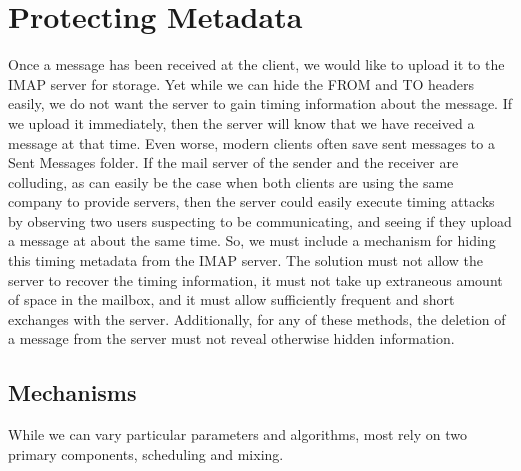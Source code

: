 \documentclass[pageno]{jpaper}
\newcommand{\project}{IMAPSec }
\begin{document}
\section{Protecting Metadata}
Once a message has been received at the client, we would like to upload it to the IMAP server for storage. Yet while we can hide the FROM and TO headers easily, we do not want the server to gain timing information about the message. If we upload it immediately, then the server will know that we have received a message at that time. Even worse, modern clients often save sent messages to a Sent Messages folder. If the mail server of the sender and the receiver are colluding, as can easily be the case when both clients are using the same company to provide servers, then the server could easily execute timing attacks by observing two users suspecting to be communicating, and seeing if they upload a message at about the same time. So, we must include a mechanism for hiding this timing metadata from the IMAP server. The solution must not allow the server to recover the timing information, it must not take up extraneous amount of space in the mailbox, and it must allow sufficiently frequent and short exchanges with the server. Additionally, for any of these methods, the deletion of a message from the server must not reveal otherwise hidden information.

\subsection{Mechanisms}
While we can vary particular parameters and algorithms, most rely on two primary components, scheduling and mixing.

\end{document}
